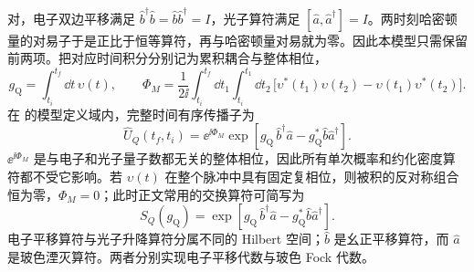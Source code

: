 对，电子双边平移满足 $\hat b^\dagger\hat b=\hat b\hat b^\dagger=I$，光子算符满足 $[\hat a,\hat a^\dagger]=I$。两时刻哈密顿量的对易子于是正比于恒等算符，再与哈密顿量对易就为零。因此本模型只需保留前两项。把对应时间积分分别记为累积耦合与整体相位，
\begin{equation}
{
g_{\mathrm Q}=\int_{t_i}^{t_f}\dd t\,\upsilon(t),
\qquad
\Phi_M
=\frac{1}{2\ii}
\int_{t_i}^{t_f}\dd t_1
\int_{t_i}^{t_1}\dd t_2\,
\bigl[\upsilon^*(t_1)\upsilon(t_2)-\upsilon(t_1)\upsilon^*(t_2)\bigr].}
\label{eq:qpinem-magnus-pulse-parameters-dp68}
\end{equation}
在 的模型定义域内，完整时间有序传播子为
\begin{equation}
{
\hat U_Q(t_f,t_i)
=\ee^{\ii\Phi_M}
\exp[g_{\mathrm Q}\,\hat b^\dagger\hat a-g_{\mathrm Q}^*\hat b\hat a^\dagger].}
\label{eq:qpinem-magnus-exact-dp68}
\end{equation}
$\ee^{\ii\Phi_M}$ 是与电子和光子量子数都无关的整体相位，因此所有单次概率和约化密度算符都不受它影响。若 $\upsilon(t)$ 在整个脉冲中具有固定复相位，则被积的反对称组合恒为零，$\Phi_M=0$；此时正文常用的交换算符可简写为
\begin{equation}
{
S_Q(g_{\mathrm Q})=\exp[g_{\mathrm Q}\,\hat b^\dagger\hat a-g_{\mathrm Q}^*\hat b\hat a^\dagger].}
\label{eq:qpinem_S}
\end{equation}
电子平移算符与光子升降算符分属不同的 Hilbert 空间；$\hat b$ 是幺正平移算符，而 $\hat a$ 是玻色湮灭算符。两者分别实现电子平移代数与玻色 Fock 代数。

